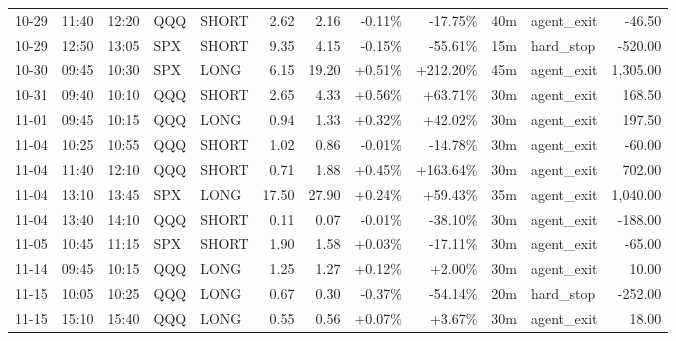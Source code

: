 \documentclass[11pt,a4paper,twoside]{article}
\begin{document}
\begin{center}
\begin{longtable}{>{\color{txtmain}}l l l l l r r r r r >{\color{txtmain}}l r}
10-29 & 11:40 & 12:20 & QQQ & SHORT & 2.62 & 2.16 & \textcolor{lossred}{-0.11\%} & \textcolor{lossred}{-17.75\%} & 40m & agent\_exit & \textcolor{lossred}{-46.50} \\
10-29 & 12:50 & 13:05 & SPX & SHORT & 9.35 & 4.15 & \textcolor{lossred}{-0.15\%} & \textcolor{lossred}{-55.61\%} & 15m & hard\_stop & \textcolor{lossred}{-520.00} \\
10-30 & 09:45 & 10:30 & SPX & LONG & 6.15 & 19.20 & \textcolor{wingreen}{+0.51\%} & \textcolor{wingreen}{+212.20\%} & 45m & agent\_exit & \textcolor{wingreen}{1,305.00} \\
10-31 & 09:40 & 10:10 & QQQ & SHORT & 2.65 & 4.33 & \textcolor{wingreen}{+0.56\%} & \textcolor{wingreen}{+63.71\%} & 30m & agent\_exit & \textcolor{wingreen}{168.50} \\
11-01 & 09:45 & 10:15 & QQQ & LONG & 0.94 & 1.33 & \textcolor{wingreen}{+0.32\%} & \textcolor{wingreen}{+42.02\%} & 30m & agent\_exit & \textcolor{wingreen}{197.50} \\
11-04 & 10:25 & 10:55 & QQQ & SHORT & 1.02 & 0.86 & \textcolor{lossred}{-0.01\%} & \textcolor{lossred}{-14.78\%} & 30m & agent\_exit & \textcolor{lossred}{-60.00} \\
11-04 & 11:40 & 12:10 & QQQ & SHORT & 0.71 & 1.88 & \textcolor{wingreen}{+0.45\%} & \textcolor{wingreen}{+163.64\%} & 30m & agent\_exit & \textcolor{wingreen}{702.00} \\
11-04 & 13:10 & 13:45 & SPX & LONG & 17.50 & 27.90 & \textcolor{wingreen}{+0.24\%} & \textcolor{wingreen}{+59.43\%} & 35m & agent\_exit & \textcolor{wingreen}{1,040.00} \\
11-04 & 13:40 & 14:10 & QQQ & SHORT & 0.11 & 0.07 & \textcolor{lossred}{-0.01\%} & \textcolor{lossred}{-38.10\%} & 30m & agent\_exit & \textcolor{lossred}{-188.00} \\
11-05 & 10:45 & 11:15 & SPX & SHORT & 1.90 & 1.58 & \textcolor{wingreen}{+0.03\%} & \textcolor{lossred}{-17.11\%} & 30m & agent\_exit & \textcolor{lossred}{-65.00} \\
11-14 & 09:45 & 10:15 & QQQ & LONG & 1.25 & 1.27 & \textcolor{wingreen}{+0.12\%} & \textcolor{wingreen}{+2.00\%} & 30m & agent\_exit & \textcolor{wingreen}{10.00} \\
11-15 & 10:05 & 10:25 & QQQ & LONG & 0.67 & 0.30 & \textcolor{lossred}{-0.37\%} & \textcolor{lossred}{-54.14\%} & 20m & hard\_stop & \textcolor{lossred}{-252.00} \\
11-15 & 15:10 & 15:40 & QQQ & LONG & 0.55 & 0.56 & \textcolor{wingreen}{+0.07\%} & \textcolor{wingreen}{+3.67\%} & 30m & agent\_exit & \textcolor{wingreen}{18.00} \\

\end{longtable}
\end{center}
\end{document}
